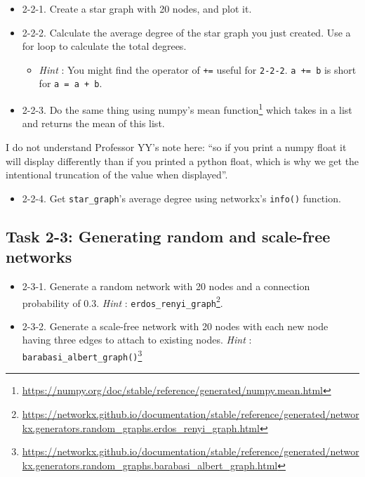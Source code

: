 \documentclass[
]{krantz}
\makeatletter
\providecommand{\tightlist}{%
  \setlength{\itemsep}{0pt}\setlength{\parskip}{0pt}}
\renewcommand{\href}[2]{#2\footnote{\url{#1}}}
\newenvironment{kframe}{%
\medskip{}
\setlength{\fboxsep}{.8em}
 \def\at@end@of@kframe{}%
 \ifinner\ifhmode%
  \def\at@end@of@kframe{\end{minipage}}%
  \begin{minipage}{\columnwidth}%
 \fi\fi%
 \def\FrameCommand##1{\hskip\@totalleftmargin \hskip-\fboxsep
 \colorbox{shadecolor}{##1}\hskip-\fboxsep
     \hskip-\linewidth \hskip-\@totalleftmargin \hskip\columnwidth}%
 \MakeFramed {\advance\hsize-\width
   \@totalleftmargin\z@ \linewidth\hsize
   \@setminipage}}%
 {\par\unskip\endMakeFramed%
 \at@end@of@kframe}
\newenvironment{rmdblock}[1]
  {
  \begin{itemize}
  \renewcommand{\labelitemi}{
    \raisebox{-.7\height}[0pt][0pt]{
      {\setkeys{Gin}{width=3em,keepaspectratio}\texttt{[image: images/\#1]}}
    }
  }
  \setlength{\fboxsep}{1em}
  \begin{kframe}
  \item
  }
  {
  \end{kframe}
  \end{itemize}
  }
\newenvironment{rmdreminder}
  {\begin{rmdblock}{reminder}}
  {\end{rmdblock}}
\makeatother
\begin{document}
\begin{itemize}
\item
  2-2-1. Create a star graph with 20 nodes, and plot it.
\item
  2-2-2. Calculate the average degree of the star graph you just created. Use a for loop to calculate the total degrees.

  \begin{itemize}
  \tightlist
  \item
    \emph{Hint} : You might find the operator of \texttt{+=} useful for \texttt{2-2-2}. \texttt{a\ +=\ b} is short for \texttt{a\ =\ a\ +\ b}.
  \end{itemize}
\item
  2-2-3. Do the same thing using \href{https://numpy.org/doc/stable/reference/generated/numpy.mean.html}{numpy's mean function} which takes in a list and returns the mean of this list.
\end{itemize}

\begin{rmdreminder}
I do not understand Professor YY's note here: ``so if you print a numpy float it will display differently than if you printed a python float, which is why we get the intentional truncation of the value when displayed''.
\end{rmdreminder}

\begin{itemize}
\tightlist
\item
  2-2-4. Get \texttt{star\_graph}'s average degree using networkx's \texttt{info()} function.
\end{itemize}

\hypertarget{task-2-3-generating-random-and-scale-free-networks}{%
\subsection{Task 2-3: Generating random and scale-free networks}\label{task-2-3-generating-random-and-scale-free-networks}}

\begin{itemize}
\item
  2-3-1. Generate a random network with 20 nodes and a connection probability of 0.3. \emph{Hint} : \href{https://networkx.github.io/documentation/stable/reference/generated/networkx.generators.random_graphs.erdos_renyi_graph.html}{\texttt{erdos\_renyi\_graph}}.
\item
  2-3-2. Generate a scale-free network with 20 nodes with each new node having three edges to attach to existing nodes. \emph{Hint} : \href{https://networkx.github.io/documentation/stable/reference/generated/networkx.generators.random_graphs.barabasi_albert_graph.html}{\texttt{barabasi\_albert\_graph()}}
\end{itemize}
\end{document}
